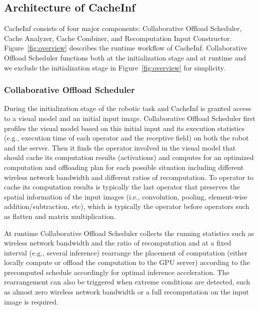 \subsection{Architecture of CacheInf}
CacheInf consists of four major components: Collaborative Offload Scheduler, Cache Analyzer, Cache Combiner, and Recomputation Input Constructor.
Figure~\ref{fig:overview} describes the runtime workflow of CacheInf.
Collaborative Offload Scheduler functions both at the initialization stage and at runtime and we exclude the initialization stage in Figure~\ref{fig:overview} for simplicity.

\subsubsection{Collaborative Offload Scheduler}
During the initialization stage of the robotic task and CacheInf is granted access to a visual model and an initial input image.
Collaborative Offload Scheduler first profiles the visual model based on this initial input and its execution statistics (e.g., execution time of each operator and the receptive field) on both the robot and the server.
Then it finds the operator involved in the visual model that should cache its computation results (activations) and computes for an optimized computation and offloading plan for each possible situation including different wireless network bandwidth and different ratios of recomputation.
To operator to cache its computation results is typically the last operator that preserves the spatial information of the input images (i.e., convolution, pooling, element-wise addition/subtraction, etc), which is typically the operator before operators such as flatten and matrix multiplication.

At runtime Collaborative Offload Scheduler collects the running statistics such as wireless network bandwidth and the ratio of recomputation and at a fixed interval (e.g., several inference) rearrange the placement of computation (either locally compute or offload the computation to the GPU server) according to the precomputed schedule accordingly for optimal inference acceleration.
The rearrangement can also be triggered when extreme conditions are detected, such as almost zero wireless network bandwidth or a full recomputation on the input image is required.


